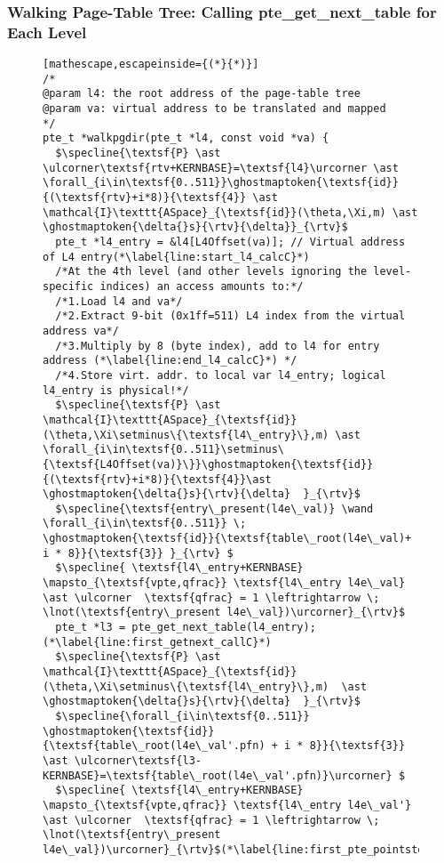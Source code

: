 \subsubsection{Walking Page-Table Tree: Calling \textsf{pte\_get\_next\_table} for Each Level}
\label{wlkpgdirC}
\begin{figure}\footnotesize
\ifPLDI
\begin{lstlisting}[mathescape,escapeinside={(*}{*)}]
/*
@param l4: the root address of the page-table tree
@param va: virtual address to be translated and mapped
*/
pte_t *walkpgdir(pte_t *l4, const void *va) {
  $\specline{\textsf{P} \ast \ulcorner\textsf{rtv+KERNBASE}=\textsf{l4}\urcorner \ast \forall_{i\in\textsf{0..511}}\ghostmaptoken{\textsf{id}}{(\textsf{rtv}+i*8)}{\textsf{4}} \ast \mathcal{I}\texttt{ASpace}_{\textsf{id}}(\theta,\Xi,m) \ast \ghostmaptoken{\delta{}s}{\rtv}{\delta}}_{\rtv}$
  pte_t *l4_entry = &l4[L4Offset(va)]; // Virtual address of L4 entry(*\label{line:start_l4_calcC}*)
  /*At the 4th level (and other levels ignoring the level-specific indices) an access amounts to:*/
  /*1.Load l4 and va*/
  /*2.Extract 9-bit (0x1ff=511) L4 index from the virtual address va*/
  /*3.Multiply by 8 (byte index), add to l4 for entry address (*\label{line:end_l4_calcC}*) */
  /*4.Store virt. addr. to local var l4_entry; logical l4_entry is physical!*/
  $\specline{\textsf{P} \ast \mathcal{I}\texttt{ASpace}_{\textsf{id}}(\theta,\Xi\setminus\{\textsf{l4\_entry}\},m) \ast \forall_{i\in\textsf{0..511}\setminus\{\textsf{L4Offset(va)}\}}\ghostmaptoken{\textsf{id}}{(\textsf{rtv}+i*8)}{\textsf{4}}\ast \ghostmaptoken{\delta{}s}{\rtv}{\delta}  }_{\rtv}$
  $\specline{\textsf{entry\_present(l4e\_val)} \wand \forall_{i\in\textsf{0..511}} \; \ghostmaptoken{\textsf{id}}{\textsf{table\_root(l4e\_val)+ i * 8}}{\textsf{3}} }_{\rtv} $
  $\specline{ \textsf{l4\_entry+KERNBASE} \mapsto_{\textsf{vpte,qfrac}} \textsf{l4\_entry l4e\_val} \ast \ulcorner  \textsf{qfrac} = 1 \leftrightarrow \; \lnot(\textsf{entry\_present l4e\_val})\urcorner}_{\rtv}$    
  pte_t *l3 = pte_get_next_table(l4_entry); (*\label{line:first_getnext_callC}*) 
  $\specline{\textsf{P} \ast \mathcal{I}\texttt{ASpace}_{\textsf{id}}(\theta,\Xi\setminus\{\textsf{l4\_entry}\},m)  \ast \ghostmaptoken{\delta{}s}{\rtv}{\delta}  }_{\rtv}$
  $\specline{\forall_{i\in\textsf{0..511}} \ghostmaptoken{\textsf{id}}{\textsf{table\_root(l4e\_val'.pfn) + i * 8}}{\textsf{3}}  \ast \ulcorner\textsf{l3-KERNBASE}=\textsf{table\_root(l4e\_val'.pfn)}\urcorner} $
  $\specline{ \textsf{l4\_entry+KERNBASE} \mapsto_{\textsf{vpte,qfrac}} \textsf{l4\_entry l4e\_val'} \ast \ulcorner  \textsf{qfrac} = 1 \leftrightarrow \; \lnot(\textsf{entry\_present l4e\_val})\urcorner}_{\rtv}$(*\label{line:first_pte_pointstoC}*)

\end{lstlisting}
\end{figure}
